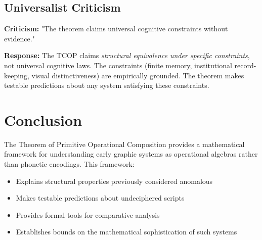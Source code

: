 \documentclass[12pt,a4paper]{article}
\begin{document}
\subsection{Universalist Criticism}

\textbf{Criticism:} "The theorem claims universal cognitive constraints without evidence."

\textbf{Response:} The TCOP claims \textit{structural equivalence under specific constraints}, not universal cognitive laws. The constraints (finite memory, institutional record-keeping, visual distinctiveness) are empirically grounded. The theorem makes testable predictions about any system satisfying these constraints.

\section{Conclusion}

The Theorem of Primitive Operational Composition provides a mathematical framework for understanding early graphic systems as operational algebras rather than phonetic encodings. This framework:
\begin{itemize}
    \item Explains structural properties previously considered anomalous
    \item Makes testable predictions about undeciphered scripts
    \item Provides formal tools for comparative analysis
    \item Establishes bounds on the mathematical sophistication of such systems
\end{itemize}
\end{document}
